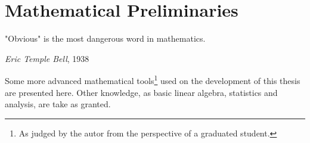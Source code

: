 \chapter{Mathematical Preliminaries}
\label{c:math}
\epigraph{"Obvious" is the most dangerous word in mathematics.}{\textit{Eric Temple
Bell}, 1938}

Some more advanced mathematical tools\footnote{As judged by the autor
from the perspective of a graduated student.} used on the development of this
thesis are presented here.
Other knowledge, as basic linear algebra, statistics and analysis, are take as
granted.



